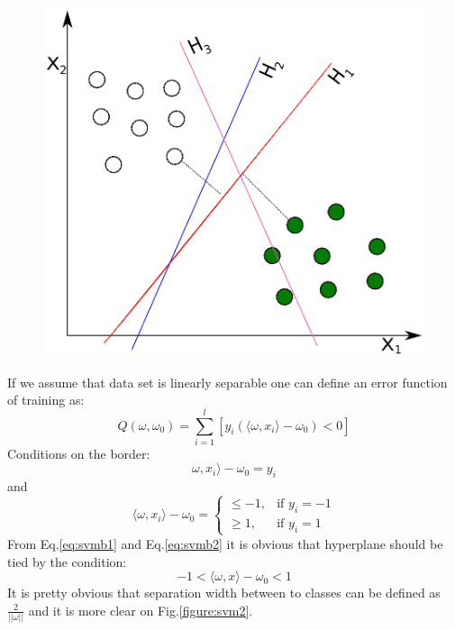 \begin{figure}[h!]
\centering
\includegraphics[width=1\textwidth]{figures/chap3/svm1.eps}
\caption{}
\label{figure:svm1}
\end{figure}
If we assume that data set is linearly separable one can define an error function of training as: 
\begin{equation}
Q(\omega,\omega_0)=\sum_{i=1}^l[y_i(\langle \omega,x_i\rangle-\omega_0)<0]
\end{equation}
Conditions on the border: 
\begin{equation}\label{eq:svmb1}
\omega,x_i\rangle-\omega_0=y_i
\end{equation} 
and 
\begin{equation}\label{eq:svmb2}
\langle \omega,x_i\rangle-\omega_0 = \begin{cases} \leq-1, & \mbox{if } y_i=-1 \\ \geq1 , & \mbox{if } y_i=1 \end{cases}
\end{equation}
From Eq.\ref{eq:svmb1} and Eq.\ref{eq:svmb2} it is obvious that hyperplane should be tied by the condition: 
\begin{equation}\label{eq:svmb3}
-1<\langle \omega,x\rangle-\omega_0<1
\end{equation}
It is pretty obvious that separation width between to classes can be defined as $\frac{2}{||\omega||}$ and it is more clear on Fig.\ref{figure:svm2}.  
